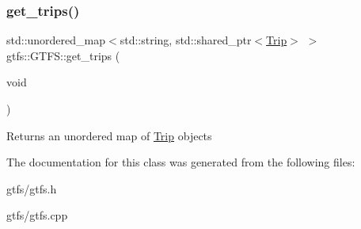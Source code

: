 \subsubsection{\texorpdfstring{get\+\_\+trips()}{get\_trips()}}
{\footnotesize\ttfamily std\+::unordered\+\_\+map$<$std\+::string, std\+::shared\+\_\+ptr$<$\hyperlink{classgtfs_1_1Trip}{Trip}$>$ $>$ gtfs\+::\+G\+T\+F\+S\+::get\+\_\+trips (\begin{DoxyParamCaption}\item[{void}]{ }\end{DoxyParamCaption})\hspace{0.3cm}{\ttfamily [inline]}}

\begin{DoxyReturn}{Returns}
an unordered map of \hyperlink{classgtfs_1_1Trip}{Trip} objects 
\end{DoxyReturn}


The documentation for this class was generated from the following files\+:\begin{DoxyCompactItemize}
\item 
gtfs/gtfs.\+h\item 
gtfs/gtfs.\+cpp\end{DoxyCompactItemize}
